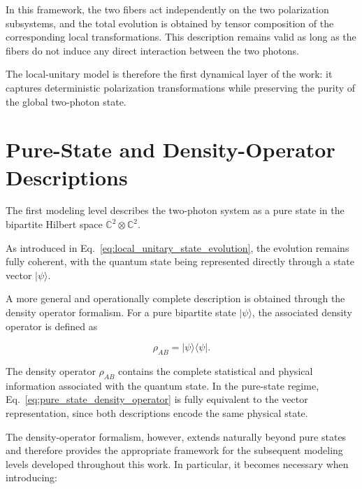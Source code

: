 \medskip

In this framework, the two fibers act independently on the two polarization subsystems, and the total evolution is obtained by tensor composition of the corresponding local transformations. This description remains valid as long as the fibers do not induce any direct interaction between the two photons.

\medskip

The local-unitary model is therefore the first dynamical layer of the work: it captures deterministic polarization transformations while preserving the purity of the global two-photon state.


\section{Pure-State and Density-Operator Descriptions}
\label{sec:pure_state_and_density_operator_descriptions}

The first modeling level describes the two-photon system as a pure state in the bipartite Hilbert space
\( \mathbb{C}^2 \otimes \mathbb{C}^2 \). 

\medskip

As introduced in Eq.~\eqref{eq:local_unitary_state_evolution}, the evolution remains fully coherent, with the quantum state being represented directly through a state vector
\( |\psi\rangle \).

\medskip

A more general and operationally complete description is obtained through the density operator formalism. For a pure bipartite state \( |\psi\rangle \), the associated density operator is defined as

\begin{equation}
\rho_{AB}
=
|\psi\rangle\langle\psi| .
\label{eq:pure_state_density_operator}
\end{equation}

The density operator \( \rho_{AB} \) contains the complete statistical and physical information associated with the quantum state. In the pure-state regime, Eq.~\eqref{eq:pure_state_density_operator} is fully equivalent to the vector representation, since both descriptions encode the same physical state.

\medskip

The density-operator formalism, however, extends naturally beyond pure states and therefore provides the appropriate framework for the subsequent modeling levels developed throughout this work. In particular, it becomes necessary when introducing:

